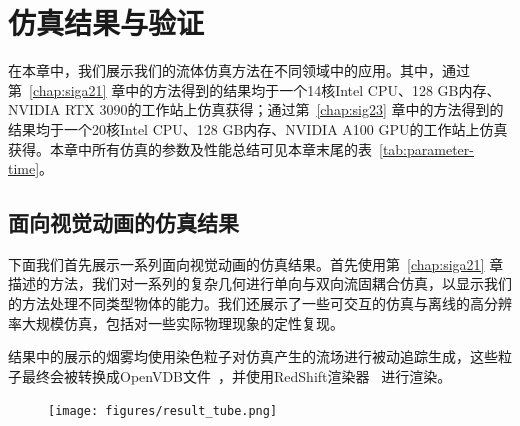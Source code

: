 \chapter{仿真结果与验证}
\label{chap:results}

在本章中，我们展示我们的流体仿真方法在不同领域中的应用。其中，通过第~\ref{chap:siga21} 章中的方法得到的结果均于一个14核Intel CPU、128 GB内存、NVIDIA RTX 3090的工作站上仿真获得；通过第~\ref{chap:sig23} 章中的方法得到的结果均于一个20核Intel CPU、128 GB内存、NVIDIA A100 GPU的工作站上仿真获得。本章中所有仿真的参数及性能总结可见本章末尾的表~\ref{tab:parameter-time}。

\section{面向视觉动画的仿真结果}
下面我们首先展示一系列面向视觉动画的仿真结果。首先使用第~\ref{chap:siga21} 章描述的方法，我们对一系列的复杂几何进行单向与双向流固耦合仿真，以显示我们的方法处理不同类型物体的能力。我们还展示了一些可交互的仿真与离线的高分辨率大规模仿真，包括对一些实际物理现象的定性复现。

结果中的展示的烟雾均使用染色粒子对仿真产生的流场进行被动追踪生成，这些粒子最终会被转换成OpenVDB文件~\citep{Museth-2013}，并使用RedShift渲染器~\citep{redshift} 进行渲染。

\begin{figure}[!htbp]
  \centering
    \texttt{[image: figures/result\_tube.png]}
  \label{img:result-tube}
\end{figure}


